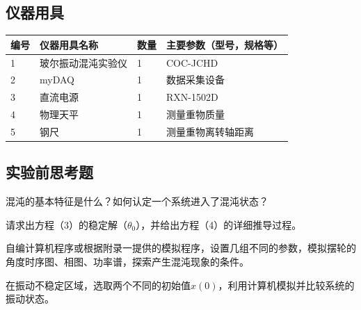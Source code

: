 \documentclass[dvipsnames, svgnames,a4paper,11pt]{article}
\newcommand{\recordblank}[1]{\par\vspace*{#1}\par}
\begin{document}
\subsection{仪器用具}
\begin{table}[htbp]
	\centering
	\renewcommand\arraystretch{1.6}
	\begin{tabular}{p{}|p{}|p{}|p{}}
	\hline
	编号& 仪器用具名称 & 数量 &  主要参数（型号，规格等） \\
	\hline
	1 & 玻尔振动混沌实验仪 & 1 & COC-JCHD \\
	2 & myDAQ & 1 & 数据采集设备 \\
	3 & 直流电源 & 1 & RXN-1502D \\
	4 & 物理天平 & 1 & 测量重物质量 \\
	5 & 钢尺 & 1 & 测量重物离转轴距离 \\
	\hline
\end{tabular}
\end{table}

\subsection{实验前思考题}

\begin{question}
混沌的基本特征是什么？如何认定一个系统进入了混沌状态？
\end{question}
\recordblank{4cm}

\begin{question}
请求出方程（3）的稳定解（$\theta_0$），并给出方程（4）的详细推导过程。
\end{question}
\recordblank{4cm}

\begin{question}
自编计算机程序或根据附录一提供的模拟程序，设置几组不同的参数，模拟摆轮的角度时序图、相图、功率谱，探索产生混沌现象的条件。
\end{question}
\recordblank{4cm}
\clearpage
\begin{question}
在振动不稳定区域，选取两个不同的初始值$x(0)$，利用计算机模拟并比较系统的振动状态。
\end{question}
\recordblank{4cm}
\end{document}
